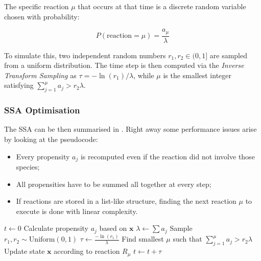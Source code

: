 The specific reaction $\mu$ that occurs at that time is a discrete random variable
chosen with probability:

\begin{equation}\label{eq:nextreactionprobability}
	P(\text{reaction} = \mu) = \frac{a_{\mu}}{\lambda}
\end{equation}

To simulate this, two independent random numbers $r_1, r_2 \in (0, 1]$ are
sampled from a uniform distribution. The time step is then computed via the
\emph{Inverse Transform Sampling} as $\tau = -\ln(r_1)/\lambda$, while $\mu$ is
the smallest integer satisfying $\sum_{j=1}^{\mu} a_j > r_2 \lambda$.

\subsubsection{\ac{SSA} Optimisation}

The \ac{SSA} can be then summarised in . Right away some performance
issues arise by looking at the pseudocode:
\begin{itemize}
	\item Every propensity $a_j$ is recomputed even if the reaction did not
	      involve those species;
	\item All propensities have to be summed all together at every step;
	\item If reactions are stored in a list-like structure, finding the
	      next reaction $\mu$ to execute is done with linear complexity.
\end{itemize}

\begin{algorithm}
	\caption{Stochastic Simulation Algorithm (Direct Method)}\label{alg:ssa}
	\begin{algorithmic}[1]
		\State $t \gets 0$
		\State Calculate propensity $a_j$ based on $\mathbf{x}$
		\EndFor
		\State $\lambda \gets \sum a_j$
		\State Sample $r_1, r_2 \sim \text{Uniform}(0, 1)$
		\State $\tau \gets \frac{-\ln(r_1)}{\lambda}$ 
		\State Find smallest $\mu$ such that $\sum_{j=1}^{\mu} a_j > r_2 \lambda$ 
		\State Update state $\mathbf{x}$ according to reaction $R_\mu$
		\State $t \gets t + \tau$
		\EndWhile
		\EndProcedure
	\end{algorithmic}
\end{algorithm}

